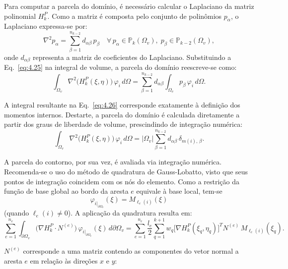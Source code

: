     \indent Para computar a parcela do domínio, é necessário calcular o Laplaciano da matriz polinomial $H_k^P$. Como a matriz é composta pelo conjunto de polinômios $p_\alpha$, o Laplaciano expressa-se por:
    \begin{equation}
        \nabla^2 p_\alpha = \sum_{\beta=1}^{n_{k-2}} d_{\alpha\beta}\, p_\beta 
        \quad\forall\, p_\alpha\in\mathbb{P}_k(\Omega_v),\; p_\beta\in\mathbb{P}_{k-2}(\Omega_v),
        \label{eq:4.25}
    \end{equation}
    \noindent onde $d_{\alpha\beta}$ representa a matriz de coeficientes do Laplaciano. Substituindo a Eq.~\eqref{eq:4.25} na integral de volume, a parcela do domínio reescreve-se como:
    \begin{equation}
        \int_{\Omega_v}\nabla^2\bigl(H_k^P(\xi,\eta)\bigr)\,\varphi_i\,d\Omega 
        = \sum_{\beta=1}^{n_{k-2}} d_{\alpha\beta}\int_{\Omega_v}p_\beta\,\varphi_i\,d\Omega.
        \label{eq:4.26}
    \end{equation}

    \indent A integral resultante na Eq.~\eqref{eq:4.26} corresponde exatamente à definição dos momentos internos. Destarte, a parcela do domínio é calculada diretamente a partir dos graus de liberdade de volume, prescindindo de integração numérica:
    \begin{equation}
        \int_{\Omega_v}\nabla^2\bigl(H_k^P(\xi,\eta)\bigr)\,\varphi_i\,d\Omega 
        = |\Omega_v|\sum_{\beta=1}^{n_{k-2}} d_{\alpha\beta}\,\delta_{m(i),\,\beta}.
        \label{eq:4.27}
    \end{equation}
    
    \indent A parcela do contorno, por sua vez, é avaliada via integração numérica. Recomenda-se o uso do método de quadratura de Gauss-Lobatto, visto que seus pontos de integração coincidem com os nós do elemento. Como a restrição da função de base global ao bordo da aresta $e$ equivale à base local, tem-se $$ \varphi_{i\big|_{\partial \Omega_v}}(\xi) = M_{\ell_e(i)}(\xi)$$ (quando $\ell_e(i)\neq 0$). A aplicação da quadratura resulta em:
    \begin{equation}
        \sum_{e=1}^{n_e}\int_{\partial \Omega_v}\bigl(\nabla H_k^P\cdot N^{(e)}\bigr)\,\varphi_{i\big|_{\partial \Omega_v}}(\xi)\,d\partial \Omega_v 
        = \sum_{e=1}^{n_e}\frac{l_e}{2}\sum_{q=1}^{k+1}w_q \bigl[\nabla H_k^P(\xi_q,\eta_q) \bigr]^T N^{(e)}\,M_{\ell_e(i)}(\xi_q).
        \label{eq:4.28}
    \end{equation}

    \indent $N^{(e)}$ corresponde a uma matriz contendo as componentes do vetor normal a aresta $e$ em relação às direções $x$ e $y$:
    
